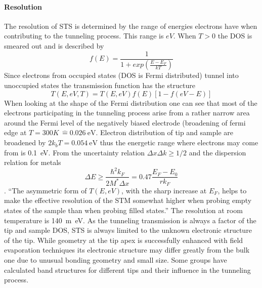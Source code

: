 \paragraph{Resolution}
The resolution of STS is determined by the range of energies electrons have when contributing to the tunneling process. This range is $eV$. When $T>0$ the DOS is smeared out and is described by $$f(E)=\frac{1}{1+exp\left(\frac{E-E_F}{kT}\right)}$$ 
Since electrons from occupied states (DOS is Fermi distributed) tunnel into unoccupied states the transmission function has the structure $$T(E,eV,T)=T(E,eV)f(E)[1-f(eV-E)]$$ 
When looking at the shape of the Fermi distribution one can see that most of the electrons participating in the tunneling process arise from a rather narrow area around the Fermi level of the negatively biased electrode (broadening of fermi edge at $T=300K\,\hat=\SI{0.026}{\eV}$. Electron distribution of tip and sample are broadened by $2 k_b T=\SI{0.054}{\eV}$ thus the energetic range where electrons may come from is \SI{0.1}{\eV}. From the uncertainty relation $\Delta x \Delta k \geq 1/2$ and the dispersion relation for metals $$ \Delta E\ge \frac{\hbar^2k_F}{2M^*\Delta x}=0.47\frac{E_F-E_0}{rk_F} $$\cite{chen_introduction_2008}. ``The asymmetric form of $T(E,eV)$, with the sharp increase at $E_F$, helps to make the effective resolution of the STM somewhat higher when probing empty states of the sample than when probing filled states.''
The resolution at room temperature is \SI{140}{\m\eV}\cite{hansma_tunneling_1982}.
As the tunneling transmission is always a factor of the tip and sample DOS, STS is always limited to the unknown electronic structure of the tip. While geometry at the tip apex is successfully enhanced with field evaporation techniques its electronic structure may differ greatly from the bulk one due to unusual bonding geometry and small size. Some\cite{tersoff_role_1990,ciraci_tip-sample_1990,lawunmi_theoretical_1990,kobayashi_simulation_1990} groups have calculated band structures for different tips and their influence in the tunneling process.